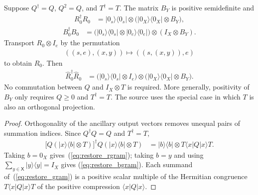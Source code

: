 \begin{theorem}
    \label{thm:restoring_grams}
    \leanok
    Suppose $Q^\dagger=Q$, $Q^2=Q$, and $T^\dagger=T$.
    The matrix $B_Y$ is positive semidefinite and
    \begin{align}
        R_0^\dagger R_0
            &=|0_s\rangle\langle0_s|\otimes
              \bigl(|0_X\rangle\langle0_X|\otimes B_Y\bigr),
              \label{eq:restore_rgram}
    \end{align}
    \begin{align}
        B_0^\dagger B_0
            &=\bigl(|0_s\rangle\langle0_s|\otimes
                    |0_e\rangle\langle0_e|\bigr)
                    \otimes(I_X\otimes B_Y).
              \label{eq:restore_bgram}
    \end{align}
    Transport $R_0\otimes I_e$ by the permutation
    \begin{align*}
        ((s,e),(x,y))\longmapsto((s,(x,y)),e)
    \end{align*}
    to obtain $\widehat R_0$. Then
    \begin{align}
        \widehat R_0^\dagger\widehat R_0
        &=\bigl(|0_s\rangle\langle0_s|\otimes I_e\bigr)
          \otimes\bigl(|0_X\rangle\langle0_X|\otimes B_Y\bigr).
    \end{align}
    No commutation between $Q$ and $I_X\otimes T$ is required.
    More generally, positivity of $B_Y$ only requires $Q\ge0$ and
    $T^\dagger=T$. The source uses the special case in which $T$
    is also an orthogonal projection.
\end{theorem}
\begin{proof}\leanok
    Orthogonality of the ancillary output vectors removes unequal pairs
    of summation indices. Since $Q^\dagger Q=Q$ and $T^\dagger=T$,
    \begin{align}
        \bigl[Q(|x\rangle\langle b|\otimes T)\bigr]^\dagger
        Q(|x\rangle\langle b|\otimes T)
        &=|b\rangle\langle b|\otimes T\langle x|Q|x\rangle T.
        \label{eq:restore_block}
    \end{align}
    Taking $b=0_X$ gives~(\ref{eq:restore_rgram}); taking $b=y$ and
    using $\sum_{y\in\mathsf X}|y\rangle\langle y|=I_X$ gives
    (\ref{eq:restore_bgram}). Each summand of~(\ref{eq:restore_gram}) is
    a positive scalar multiple of the Hermitian congruence
    $T\langle x|Q|x\rangle T$ of the positive compression
    $\langle x|Q|x\rangle$.
\end{proof}

